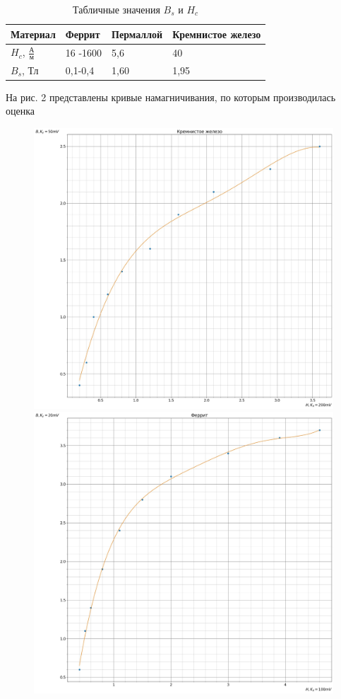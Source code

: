 \documentclass[12pt, letterpaper, oneside]{article}
\begin{document}
\begin{table}[H]
\centering
\caption{Табличные значения $B_s$ и $H_c$}
\begin{tabular}{|l|l|l|l|}
\hline
Материал                & Феррит & Пермаллой & Кремниcтое железо \\ \hline
$H_c$, $\frac{А}{м}$ & 16 -1600 & 5,6 & 40\\ \hline
$B_{s}$, Тл    & 0,1-0,4 & 1,60 & 1,95\\ \hline
\end{tabular}
\end{table}\noindent
На рис. 2 представлены кривые намагничивания, по которым производилась оценка
\begin{figure}[H]
\includegraphics[scale = 0.15]{1.jpg}
\includegraphics[scale = 0.15]{2.jpg}\\

\end{figure}
\end{document}
